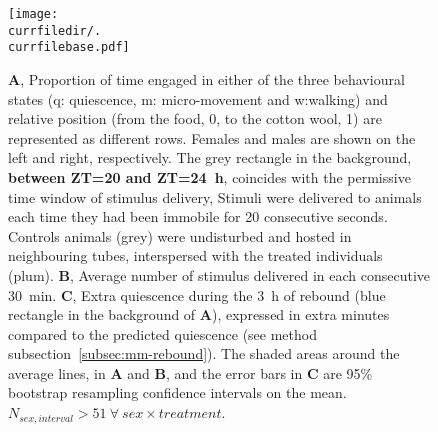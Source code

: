 \begin{figure}[h!]
	\centering   
	\texttt{[image: \\currfiledir/.\\currfilebase.pdf]}
	\caption[Four hour sleep deprivation causes a homeostatic rebound]{
	\textbf{A}, Proportion of time engaged in either of the three behavioural states (q: quiescence, m: micro-movement and w:walking) and relative position (from the food, 0, to the cotton wool, 1) 
	are represented as different rows.
	Females and males are shown on the left and right, respectively.
	The grey rectangle in the background,
	\textbf{between ZT=20 and ZT=24~h}, %
	coincides with the permissive time window of stimulus delivery,
	Stimuli were delivered to animals each time they had been immobile for 20 consecutive seconds. %
	Controls animals (grey) were undisturbed and hosted in neighbouring tubes, interspersed with the treated individuals (plum).
	\textbf{B}, Average number of stimulus delivered in each consecutive 30~min.
	\textbf{C}, Extra quiescence during the 3~h of rebound (blue rectangle in the background of \textbf{A}), expressed in extra minutes compared to the predicted quiescence (see method subsection~\ref{subsec:mm-rebound}).
	The shaded areas around the average lines, in \textbf{A} and \textbf{B}, and the error bars in \textbf{C} are 95\% bootstrap resampling confidence intervals on the mean.
	$N_{sex,interval} > 51~\forall~sex \times treatment$.
	\label{fig:\currfilebase}
}
\end{figure}

